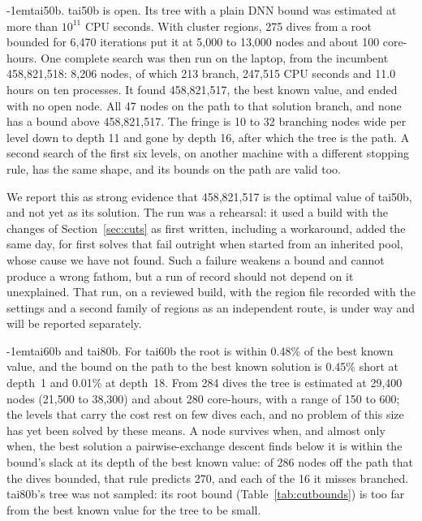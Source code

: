 \documentclass[10pt]{article}
\makeatletter
\renewcommand\paragraph{\@startsection{paragraph}{4}{\z@}{2.5ex plus 1ex minus .2ex}%
  {-1em}{\normalfont\normalsize\bfseries}}
\theoremstyle{remark}
\makeatother
\begin{document}
\paragraph{tai50b.} tai50b is open. Its tree with a plain DNN bound was estimated at
more than $10^{11}$ CPU seconds. With cluster regions, 275 dives from a root bounded
for 6,470 iterations put it at 5,000 to 13,000 nodes and about 100 core-hours. One
complete search was then run on the laptop, from the incumbent 458,821,518: 8,206
nodes, of which 213 branch, 247,515 CPU seconds and 11.0 hours on ten processes. It
found 458,821,517, the best known value, and ended with no open node. All 47 nodes
on the path to that solution branch, and none has a bound above 458,821,517. The
fringe is 10 to 32 branching nodes wide per level down to depth 11 and gone by depth
16, after which the tree is the path. A second search of the first six levels, on
another machine with a different stopping rule, has the same shape, and its bounds on
the path are valid too.

We report this as strong evidence that 458,821,517 is the optimal value of tai50b,
and not yet as its solution. The run was a rehearsal: it used a build with the
changes of Section~\ref{sec:cuts} as first written, including a workaround, added
the same day, for first solves that fail outright when started from an inherited
pool, whose cause we have not found. Such a failure weakens a bound and cannot
produce a wrong fathom, but a run of record should not depend on it unexplained.
That run, on a reviewed build, with the region file recorded with the settings and a
second family of regions as an independent route, is under way and will be reported
separately.

\paragraph{tai60b and tai80b.} For tai60b the root is within 0.48\% of the best known
value, and the bound on the path to the best known solution is 0.45\% short at
depth~1 and 0.01\% at depth~18. From 284 dives the tree is estimated at 29,400 nodes
(21,500 to 38,300) and about 280 core-hours, with a range of 150 to 600; the
levels that carry the cost rest on few dives each, and no problem of this size has
yet been solved by these means. A node survives when, and almost only when, the best
solution a pairwise-exchange descent finds below it is within the bound's slack at
its depth of the best known value: of 286 nodes off the path that the dives bounded,
that rule predicts 270, and each of the 16 it misses branched. tai80b's tree was not
sampled: its root bound (Table~\ref{tab:cutbounds}) is too far from the best known
value for the tree to be small.
\end{document}
